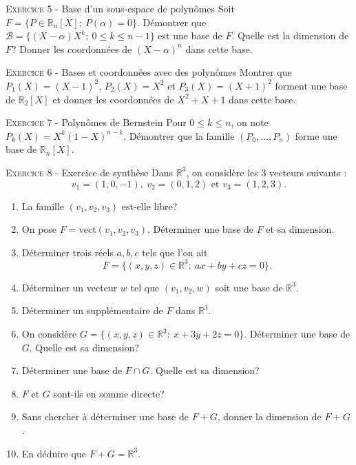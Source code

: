 \documentclass[11pt]{article}
\begin{document}


\vskip0.3cm\noindent\textsc{Exercice 5} - Base d'un sous-espace de polynômes
\vskip0.2cm
Soit $F=\{P\in\mathbb R_n[X];\ P(\alpha)=0\}$. Démontrer que $\mathcal B=\{(X-\alpha)X^k;\ 0\leq k\leq n-1\}$
est une base de $F$. Quelle est la dimension de $F$? Donner les coordonnées de $(X-\alpha)^n$ dans cette base.




\vskip0.3cm\noindent\textsc{Exercice 6} - Bases et coordonnées avec des polynômes
\vskip0.2cm
Montrer que $P_1(X)=(X-1)^2$, $P_2(X)=X^2$ et $P_3(X)=(X+1)^2$ forment une base de $\mathbb R_2[X]$ et donner les coordonnées de $X^2+X+1$ dans cette base.




\vskip0.3cm\noindent\textsc{Exercice 7} - Polynômes de Bernstein
\vskip0.2cm
Pour $0\leq k\leq n$, on note $P_k(X)=X^k(1-X)^{n-k}$. Démontrer que la famille $(P_0,\dots,P_n)$ forme une base de $\mathbb R_n[X]$.




\vskip0.3cm\noindent\textsc{Exercice 8} - Exercice de synthèse
\vskip0.2cm
Dans $\mathbb R^3$, on considère les 3 vecteurs suivants : 
$$v_1=(1,0,-1),\ v_2=(0,1,2)\textrm{ et }v_3=(1,2,3).$$
\begin{enumerate}
\item La famille $(v_1,v_2,v_3)$ est-elle libre?
\item On pose $F=\textrm{vect}(v_1,v_2,v_3)$. Déterminer une base de $F$ et sa dimension. 
\item Déterminer trois réels $a,b,c$ tels que l'on ait 
$$F=\{(x,y,z)\in\mathbb R^3:\ ax+by+cz=0\}.$$
\item Déterminer un vecteur $w$ tel que $(v_1,v_2,w)$ soit une base de $\mathbb R^3$.
\item Déterminer un supplémentaire de $F$ dans $\mathbb R^3$.
\item On considère $G=\{(x,y,z)\in\mathbb R^3:\ x+3y+2z=0\}$. Déterminer une base de $G$. Quelle est sa dimension?
\item Déterminer une base de $F\cap G$. Quelle est sa dimension?
\item $F$ et $G$ sont-ils en somme directe?
\item Sans chercher à déterminer une base de $F+G$, donner la dimension de $F+G$.
\item En déduire que $F+G=\mathbb R^3$.
\end{enumerate}
\end{document}
